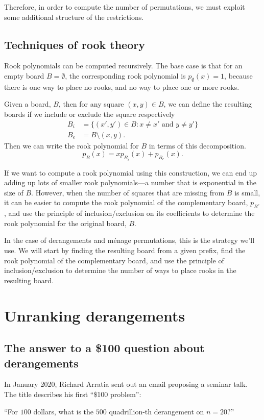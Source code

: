 Therefore, in order to compute the number of permutations, we must exploit some
additional structure of the restrictions.

\subsection{Techniques of rook theory}
Rook polynomials can be computed recursively. The base case is that
for an empty board $B = \emptyset$, the corresponding rook polynomial is
$p_\emptyset(x) = 1$, because there is one way to place no rooks, and no way
to place one or more rooks.
\begin{lemma}
  Given a board, $B$, then for any square $(x,y) \in B$, we can define
  the resulting boards if we include or exclude the square respectively
  \begin{align}
    B_i &= \{(x',y') \in B : x \neq x' \text{ and } y \neq y'\} \\
    B_e &= B \setminus {(x,y)}.
  \end{align}
  Then we can write the rook polynomial for $B$ in terms of this decomposition.
  \begin{equation}
    p_B(x) = xp_{B_i}(x) + p_{B_e}(x).
  \end{equation}
  \label{lemma:rookPolynomialRecursion}
\end{lemma}

If we want to compute a rook polynomial using this construction, we can end
up adding up lots of smaller rook polynomials---a number that is exponential in
the size of $B$.
However, when the number of squares that are missing from $B$ is small,
it can be easier to compute the rook polynomial of the complementary board,
$p_{B^c}$, and use the principle of
inclusion/exclusion on its coefficients to determine the rook polynomial for
the original board, $B$.

In the case of derangements and m\'enage permutations, this is the strategy
we'll use.
We will start by finding the resulting board from a given prefix,
find the rook polynomial of the complementary board, and
use the principle of inclusion/exclusion to determine the number of ways to
place rooks in the resulting board.

\section{Unranking derangements}

\subsection{The answer to a \$100 question about derangements}
In January 2020, Richard Arratia sent out an email proposing a seminar talk.
The title describes his first ``\$100 problem'':
\begin{problem}
``For $100$ dollars, what is the $500$ quadrillion-th derangement on $n=20$?''
\end{problem}

